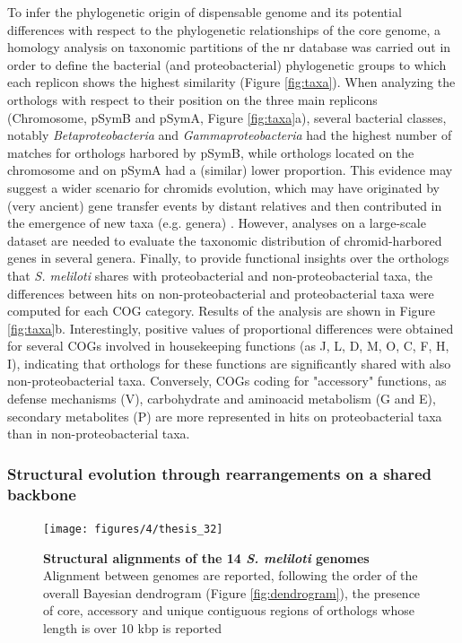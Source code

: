 To infer the phylogenetic origin of dispensable genome and its potential differences with respect to the phylogenetic relationships of the core genome, a homology analysis on taxonomic partitions of the nr database \cite{pini2011plant} was carried out in order to define the bacterial (and proteobacterial) phylogenetic groups to which each replicon shows the highest similarity (Figure \ref{fig:taxa}). When analyzing the orthologs with respect to their position on the three main replicons (Chromosome, pSymB and pSymA, Figure \ref{fig:taxa}a), several bacterial classes, notably \textit{Betaproteobacteria} and \textit{Gammaproteobacteria} had the highest number of matches for orthologs harbored by pSymB, while orthologs located on the chromosome and on pSymA had a (similar) lower proportion. This evidence may suggest a wider scenario for chromids evolution, which may have originated by (very ancient) gene transfer events by distant relatives and then contributed in the emergence of new taxa (e.g. genera) \cite{harrison2010introducing}. However, analyses on a large-scale dataset are needed to evaluate the taxonomic distribution of chromid-harbored genes in several genera. 
Finally, to provide functional insights over the orthologs that \textit{S. meliloti} shares with proteobacterial and non-proteobacterial taxa, the differences between hits on non-proteobacterial and proteobacterial taxa were computed for each COG category. Results of the analysis are shown in Figure \ref{fig:taxa}b. Interestingly, positive values of proportional differences were obtained for several COGs involved in housekeeping functions (as J, L, D, M, O, C, F, H, I), indicating that orthologs for these functions are significantly shared with also non-proteobacterial taxa. Conversely, COGs coding for "accessory" functions, as defense mechanisms (V), carbohydrate and aminoacid metabolism (G and E), secondary metabolites (P) are more represented in hits on proteobacterial taxa than in non-proteobacterial taxa.

\subsubsection{Structural evolution through rearrangements on a shared backbone}
\begin{figure}[!t]
	\center
    \texttt{[image: figures/4/thesis\_32]}
	\caption{\label{fig:structure}\textbf{Structural alignments of the 14 \textit{S. meliloti} genomes}\\
	Alignment between genomes are reported, following the order of the overall Bayesian dendrogram (Figure \ref{fig:dendrogram}), the presence of core, accessory and unique contiguous regions of orthologs whose length is over 10 kbp is reported}
\end{figure}

